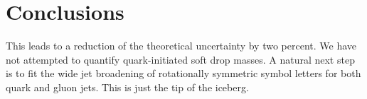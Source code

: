 \section{Conclusions}\label{sec:conclusions}

This leads to a reduction of the theoretical uncertainty by two percent.
We have not attempted to quantify quark-initiated soft drop masses. A
natural next step is to fit the wide jet broadening of rotationally
symmetric symbol letters for both quark and gluon jets. This is just the
tip of the iceberg.

